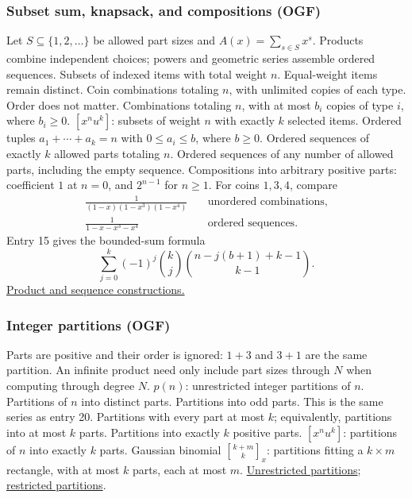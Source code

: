\subsubsection*{Subset sum, knapsack, and compositions (OGF)}
Let $S\subseteq\{1,2,\ldots\}$ be allowed part sizes and
$A(x)=\sum_{s\in S}x^s$. Products combine independent choices;
powers and geometric series assemble ordered sequences.
  {Subsets of indexed items with total weight $n$. Equal-weight items remain distinct.}
  {Coin combinations totaling $n$, with unlimited copies of each type. Order does not matter.}
  {Combinations totaling $n$, with at most $b_i$ copies of type $i$, where $b_i\ge0$.}
  {$[x^nu^k]$: subsets of weight $n$ with exactly $k$ selected items.}
  {Ordered tuples $a_1+\cdots+a_k=n$ with $0\le a_i\le b$, where $b\ge0$.}
  {Ordered sequences of exactly $k$ allowed parts totaling $n$.}
  {Ordered sequences of any number of allowed parts, including the empty sequence.}
  {Compositions into arbitrary positive parts: coefficient $1$ at $n=0$, and $2^{n-1}$ for $n\ge1$.}
For coins $1,3,4$, compare
\[
\begin{aligned}
  \frac{1}{(1-x)(1-x^3)(1-x^4)}
    &\quad\text{unordered combinations},\\
  \frac{1}{1-x-x^3-x^4}
    &\quad\text{ordered sequences}.
\end{aligned}
\]
Entry 15 gives the bounded-sum formula
\[
  \sum_{j=0}^k(-1)^j\binom{k}{j}
  \binom{n-j(b+1)+k-1}{k-1}.
\]
\href{https://aofa.cs.princeton.edu/50ac/}{Product and sequence constructions.}

\subsubsection*{Integer partitions (OGF)}
Parts are positive and their order is ignored: $1+3$ and $3+1$
are the same partition. An infinite product need only include
part sizes through $N$ when computing through degree $N$.
  {$p(n)$: unrestricted integer partitions of $n$.}
  {Partitions of $n$ into distinct parts.}
  {Partitions into odd parts. This is the same series as entry 20.}
  {Partitions with every part at most $k$; equivalently, partitions into at most $k$ parts.}
  {Partitions into exactly $k$ positive parts.}
  {$[x^nu^k]$: partitions of $n$ into exactly $k$ parts.}
  {Gaussian binomial ${k+m\brack k}_x$: partitions fitting a $k\times m$ rectangle, with at most $k$ parts, each at most $m$.}
\href{https://dlmf.nist.gov/27.14}{Unrestricted partitions};
\href{https://dlmf.nist.gov/26.9}{restricted partitions}.

